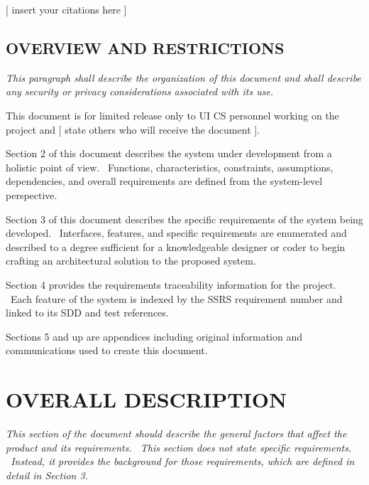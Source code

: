 \documentclass[twoside,letterpaper]{article}
\begin{document}
{\color{black}
[ insert your citations here ]}

\subsection[OVERVIEW AND
RESTRICTIONS]{\rmfamily\bfseries\color{black}
OVERVIEW AND RESTRICTIONS}
{\itshape\color{black}
This paragraph shall describe the organization of this document and
shall describe any security or privacy considerations associated with
its use.}

{\color{black}
This document is for limited release only to UI CS personnel working on
the project and [ state others who will receive the document ].}


\bigskip

{\color{black}
Section 2 of this document describes the system under development from a
holistic point of view. \ Functions, characteristics, constraints,
assumptions, dependencies, and overall requirements are defined from
the system-level perspective.}


\bigskip

{\color{black}
Section 3 of this document describes the specific requirements of the
system being developed. \ Interfaces, features, and specific
requirements are enumerated and described to a degree sufficient for a
knowledgeable designer or coder to begin crafting an architectural
solution to the proposed system.}


\bigskip

{\color{black}
Section 4 provides the requirements traceability information for the
project. \ Each feature of the system is indexed by the SSRS
requirement number and linked to its SDD and test references.}


\bigskip

{\color{black}
Sections 5 and up are appendices including original information and
communications used to create this document.}

\clearpage\section[OVERALL
DESCRIPTION]{\rmfamily\bfseries\color{black}
OVERALL DESCRIPTION}
{\color{black}
\foreignlanguage{english}{\textit{This section of the document should
describe the general factors that affect the product and its
requirements. \ This section does not state specific requirements.
\ Instead, it provides the background for those requirements, which are
defined in detail in Section 3.}}\foreignlanguage{english}{ \ }}
\end{document}
